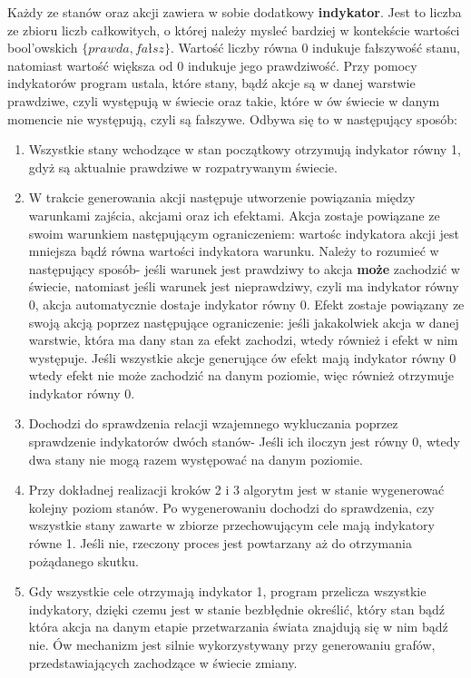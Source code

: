     Każdy ze stanów oraz akcji zawiera w sobie dodatkowy \textbf{indykator}. Jest to liczba ze zbioru liczb całkowitych, o której 
    należy mysleć bardziej w kontekście wartości bool'owskich $\{prawda,fałsz\}$. Wartość liczby równa 0 indukuje fałszywość stanu, natomiast wartość większa od 0 indukuje jego
    prawdziwość. Przy pomocy indykatorów program ustala, które stany, bądź akcje 
    są w danej warstwie prawdziwe, czyli występują w świecie oraz takie, które w ów świecie w danym momencie nie występują, czyli są fałszywe. 
    Odbywa się to w następujący sposób:
    \begin{enumerate}
        \item Wszystkie stany wchodzące w stan początkowy otrzymują indykator równy 1, gdyż są aktualnie prawdziwe 
        w rozpatrywanym świecie.
        \item W trakcie generowania akcji następuje utworzenie powiązania między warunkami zajścia, akcjami oraz ich efektami.
        Akcja zostaje powiązane ze swoim warunkiem następującym ograniczeniem: wartośc indykatora akcji jest mniejsza bądź równa wartości 
        indykatora warunku. Należy to rozumieć w następujący sposób- jeśli warunek jest prawdziwy to akcja \textbf{może} zachodzić w świecie, natomiast 
        jeśli warunek jest nieprawdziwy, czyli ma indykator równy 0, akcja automatycznie dostaje indykator równy 0.
        Efekt zostaje powiązany ze swoją akcją poprzez następujące ograniczenie: jeśli jakakolwiek akcja w danej warstwie, 
        która ma dany stan za efekt zachodzi, wtedy również i efekt w nim występuje. Jeśli wszystkie akcje generujące ów efekt mają indykator równy 0 
        wtedy efekt nie może zachodzić na danym poziomie, więc również otrzymuje indykator równy 0.
        \item Dochodzi do sprawdzenia relacji wzajemnego wykluczania poprzez sprawdzenie indykatorów dwóch stanów- Jeśli ich iloczyn jest równy 0, wtedy 
        dwa stany nie mogą razem występować na danym poziomie.
        \item Przy dokładnej realizacji kroków 2 i 3 algorytm jest w stanie wygenerować kolejny poziom stanów. Po wygenerowaniu 
        dochodzi do sprawdzenia, czy wszystkie stany zawarte w zbiorze przechowującym cele mają indykatory równe 1. Jeśli nie, 
        rzeczony proces jest powtarzany aż do otrzymania pożądanego skutku.
        \item Gdy wszystkie cele otrzymają indykator 1, program przelicza wszystkie indykatory, dzięki czemu jest w stanie bezbłędnie określić, który 
        stan bądź która akcja na danym etapie przetwarzania świata znajdują się w nim bądź nie. Ów mechanizm jest silnie wykorzystywany 
        przy generowaniu grafów, przedstawiających zachodzące w świecie zmiany.
    \end{enumerate}

